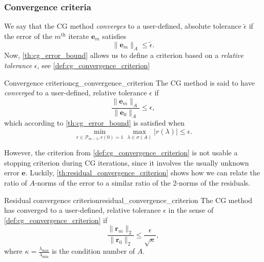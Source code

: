 \subsubsection{Convergence criteria}\label{sec:cg_convergence_criteria}
We say that the CG method \textit{converges} to a user-defined, absolute tolerance $\tilde{\epsilon}$ if the error of the $m^{\text{th}}$ iterate $\mathbf{e}_m$ satisfies
\[
  \|\mathbf{e}_m\|_A \leq \tilde{\epsilon}.
\]
Now, \cref{th:cg_error_bound} allows us to define a criterion based on a \textit{relative tolerance} $\epsilon$, see \cref{def:cg_convergence_criterion}
\begin{fancydef}{Convergence criterion}{cg_convergence_criterion}
  The CG method is said to have \textit{converged} to a user-defined, relative tolerance $\epsilon$ if
  \begin{equation*}
    \frac{\|\mathbf{e}_m\|_A}{\|\mathbf{e}_0\|_A} \leq \epsilon,
  \end{equation*}
  which according to \cref{th:cg_error_bound} is satisfied when
  \begin{equation}
    \min_{r \in \mathcal{P}_{m-1}, r(0) = 1} \max_{\lambda \in \sigma(A)} |r(\lambda)| \leq \epsilon.
    \label{eq:cg_convergence_criterion}
  \end{equation}
\end{fancydef}
However, the criterion from \cref{def:cg_convergence_criterion} is not usable a stopping criterion during CG iterations, since it involves the usually unknown error $\mathbf{e}$. Luckily, \cref{th:residual_convergence_criterion} shows how we can relate the ratio of $A$-norms of the error to a similar ratio of the 2-norms of the residuals.
\begin{fancyth}{Residual convergence criterion}{residual_convergence_criterion}
  The CG method has converged to a user-defined, relative tolerance $\epsilon$ in the sense of \cref{def:cg_convergence_criterion} if
  \begin{equation}
    \frac{\|\mathbf{r}_m\|_2}{\|\mathbf{r}_0\|_2} \leq \frac{\epsilon}{\sqrt{\kappa}},
    \label{eq:residual_convergence_criterion}
  \end{equation}
  where $\kappa = \frac{\lambda_{\text{max}}}{\lambda_{\text{min}}}$ is the condition number of $A$.
\end{fancyth}
